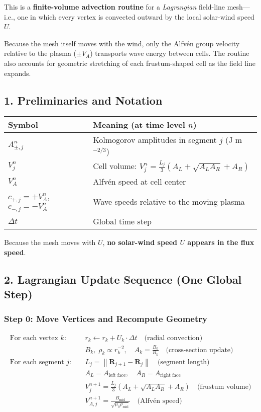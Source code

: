 \noindent
This is a \textbf{finite-volume advection routine} for a \emph{Lagrangian} field-line mesh—i.e., one in which every vertex is convected outward by the local solar-wind speed $U$.

Because the mesh itself moves with the wind, only the Alfvén group velocity relative to the plasma ($\pm V_A$) transports wave energy between cells. The routine also accounts for geometric stretching of each frustum-shaped cell as the field line expands.

\subsection*{1. Preliminaries and Notation}

\begin{center}
\renewcommand{\arraystretch}{1.3}
\begin{tabular}{@{}ll@{}}
\toprule
\textbf{Symbol} & \textbf{Meaning (at time level $n$)} \\
\midrule
$A_{\pm,j}^n$ & Kolmogorov amplitudes in segment $j$ (J m$^{-2/3}$) \\
$V_j^n$ & Cell volume: $\displaystyle V_j^n = \frac{L_j}{3} \left(A_L + \sqrt{A_L A_R} + A_R\right)$ \\
$V_A^n$ & Alfvén speed at cell center \\
$c_{+,j} = +V_A^n$,\quad $c_{-,j} = -V_A^n$ & Wave speeds relative to the moving plasma \\
$\Delta t$ & Global time step \\
\bottomrule
\end{tabular}
\end{center}

\smallskip
\noindent
Because the mesh moves with $U$, \textbf{no solar-wind speed $U$ appears in the flux speed}.

\subsection*{2. Lagrangian Update Sequence (One Global Step)}

\subsubsection*{Step 0: Move Vertices and Recompute Geometry}

\begin{align*}
\text{For each vertex } k: \quad
&r_k \leftarrow r_k + U_k \cdot \Delta t \quad \text{(radial convection)} \\
&B_k,\; \rho_k \propto r_k^{-2}, \quad A_k = \frac{B_0}{B_k} \quad \text{(cross-section update)}
\\[1em]
\text{For each segment } j: \quad
&L_j = \left\| \mathbf{R}_{j+1} - \mathbf{R}_j \right\| \quad \text{(segment length)} \\
&A_L = A_{\text{left face}}, \quad A_R = A_{\text{right face}} \\
&V_j^{n+1} = \frac{L_j}{3} \left( A_L + \sqrt{A_L A_R} + A_R \right) \quad \text{(frustum volume)} \\
&V_{A,j}^{n+1} = \frac{B_{\text{mid}}}{\sqrt{\mu_0 \rho_{\text{mid}}}} \quad \text{(Alfvén speed)}
\end{align*}

